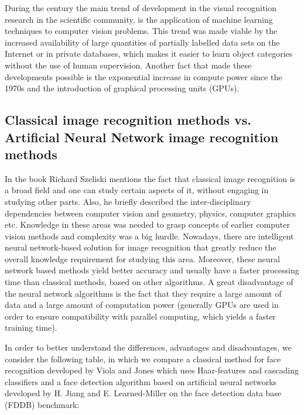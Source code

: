 \documentclass[12pt,a4paper,twoside]{report}
\begin{document}
During the  century the main trend of development in the visual recognition research in the scientific community, is the application of machine learning techniques to computer vision problems. This trend was made viable by the increased availability of large quantities of partially labelled data sets on the
Internet or in private databases, which makes it easier to learn object categories without the use of human supervision. Another fact that made these developments possible is the exponential increase in compute power since the 1970s and the introduction of graphical processing units (GPUs).

\subsection{Classical image recognition methods vs. Artificial Neural Network image recognition methods}

In the book \cite{article-cvhistory} Richard Szeliski mentions the fact that classical image recognition is a broad field and one can study certain aspects of it, without engaging in studying other parts. Also, he briefly described the inter-disciplinary dependencies between computer vision and geometry, physics, computer graphics etc. Knowledge in these areas was needed to grasp concepts of earlier computer vision methods and complexity was a big hurdle. Nowadays, there are intelligent neural network-based solution for image recognition that greatly reduce the overall knowledge requirement for studying this area. Moreover, these neural network based methods yield better accuracy and usually have a faster processing time than classical methods, based on other algorithms. A great disadvantage of the neural network algorithms is the fact that they require a large amount of data and a large amount of computation power (generally GPUs are used in order to ensure compatibility with parallel computing, which yields a faster training time).\par
In order to better understand the differences, advantages and disadvantages, we consider the following table, in which we compare a classical method for face recognition developed by Viola and Jones\cite{article-violajones} which uses Haar-features and cascading classifiers and a face detection algorithm based on artificial neural networks developed by H. Jiang and E. Learned-Miller\cite{article-faceann} on the face detection data base (FDDB) benchmark\cite{article-violaresult}: \par
\end{document}
